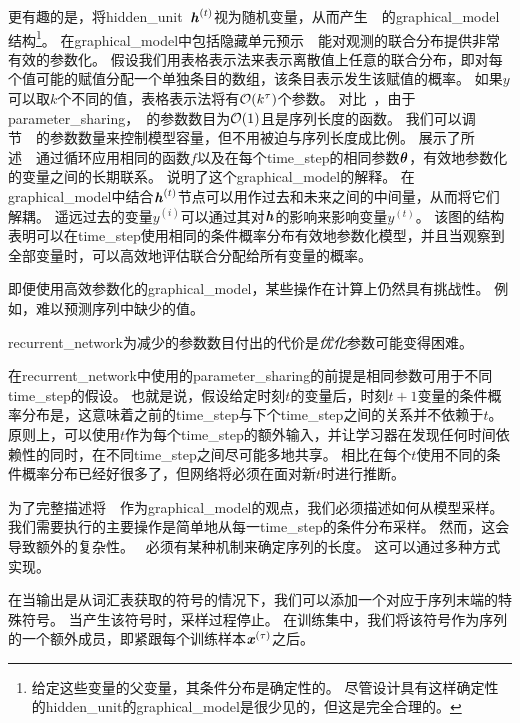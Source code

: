
更有趣的是，将\gls{hidden_unit}~$\boldsymbol{\mathit{h}}^{(t)}$视为随机变量，从而产生~~的\gls{graphical_model}结构\footnote{给定这些变量的父变量，其条件分布是确定性的。
尽管设计具有这样确定性的\gls{hidden_unit}的\gls{graphical_model}是很少见的，但这是完全合理的。}。
在\gls{graphical_model}中包括隐藏单元预示~~能对观测的联合分布提供非常有效的参数化。
假设我们用表格表示法来表示离散值上任意的联合分布，即对每个值可能的赋值分配一个单独条目的数组，该条目表示发生该赋值的概率。
如果$y$可以取$k$个不同的值，表格表示法将有$\mathcal{O}(k^\tau)$个参数。
对比~，由于\gls{parameter_sharing}，~的参数数目为$\mathcal{O}(1)$且是序列长度的函数。 %
我们可以调节~~的参数数量来控制模型容量，但不用被迫与序列长度成比例。
展示了所述~~通过循环应用相同的函数$f$以及在每个\gls{time_step}的相同参数$\boldsymbol{\theta}$，有效地参数化的变量之间的长期联系。
说明了这个\gls{graphical_model}的解释。
在\gls{graphical_model}中结合$\boldsymbol{\mathit{h}}^{(t)}$节点可以用作过去和未来之间的中间量，从而将它们解耦。
遥远过去的变量$y^{(i)}$可以通过其对$\boldsymbol{\mathit{h}}$的影响来影响变量$y^{(t)}$。
该图的结构表明可以在\gls{time_step}使用相同的条件概率分布有效地参数化模型，并且当观察到全部变量时，可以高效地评估联合分配给所有变量的概率。


即便使用高效参数化的\gls{graphical_model}，某些操作在计算上仍然具有挑战性。
例如，难以预测序列中缺少的值。

\gls{recurrent_network}为减少的参数数目付出的代价是\emph{优化}参数可能变得困难。

在\gls{recurrent_network}中使用的\gls{parameter_sharing}的前提是相同参数可用于不同\gls{time_step}的假设。
也就是说，假设给定时刻$t$的变量后，时刻$t +1$变量的条件概率分布是，这意味着之前的\gls{time_step}与下个\gls{time_step}之间的关系并不依赖于$t$。
原则上，可以使用$t$作为每个\gls{time_step}的额外输入，并让学习器在发现任何时间依赖性的同时，在不同\gls{time_step}之间尽可能多地共享。
相比在每个$t$使用不同的条件概率分布已经好很多了，但网络将必须在面对新$t$时进行推断。

为了完整描述将~~作为\gls{graphical_model}的观点，我们必须描述如何从模型采样。
我们需要执行的主要操作是简单地从每一\gls{time_step}的条件分布采样。
然而，这会导致额外的复杂性。
~必须有某种机制来确定序列的长度。
这可以通过多种方式实现。

在当输出是从词汇表获取的符号的情况下，我们可以添加一个对应于序列末端的特殊符号\citep{schmidhuber2012self}。
当产生该符号时，采样过程停止。
在训练集中，我们将该符号作为序列的一个额外成员，即紧跟每个训练样本$\boldsymbol{\mathit{x}}^{(\tau)}$之后。

